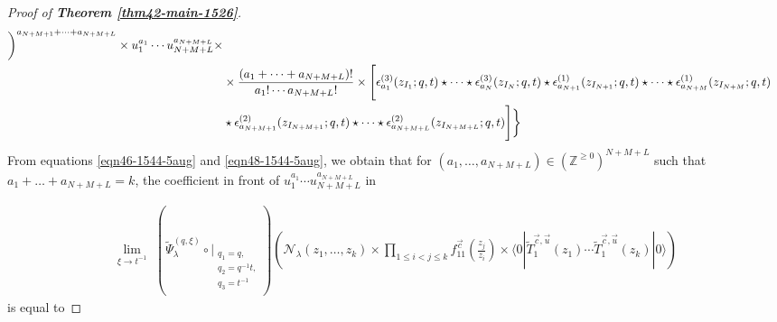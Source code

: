 \documentclass[12pt,reqno,a4paper]{amsart}
\newcommand{\comp}{\circ}
\newcommand{\cals}[1]{\mathcal{#1}}
\newcommand{\bb}[1]{\mathbb{#1}}
\numberwithin{equation}{section}
\newcommand{\dualmap}{
\widetilde{\Psi}^{(q,\xi)}_{\lambda}
}
\theoremstyle{definition}
\begin{document}
\begin{proof}[Proof of \textbf{Theorem \ref{thm42-main-1526}}]
\begin{align}
{	}
	\bigg)^{a_{N+M+1} + \cdots + a_{N+M+L}}
	\times
	u_1^{a_1}\cdots u_{N+M+L}^{a_{N+M+L}}
	\times 
	\notag 
	\\
	&\times
	\frac{
		\left(	a_1 + \cdots + a_{N+M+L}	 \right) !
	}{
		a_1! \cdots a_{N+M+L} !
	} 
	\times 
	\Bigg[
	\epsilon^{(3)}_{a_1}(z_{I_1} ; q,t) \star \cdots \star \epsilon^{(3)}_{a_N}(z_{I_N} ; q,t)
	\star \epsilon^{(1)}_{a_{N+1}}(z_{I_{N+1}} ; q,t) \star \cdots \star \epsilon^{(1)}_{a_{N+M}}(z_{I_{N+M}} ; q,t)
	\notag 
	\\
	&\star \epsilon^{(2)}_{a_{N+M+1}}(z_{I_{N+M+1}} ; q,t) \star \cdots \star \epsilon^{(2)}_{a_{N+M+L}}(z_{I_{N+M+L}} ; q,t)
	\Bigg]
	\biggr\}
	\notag 
\end{align}
\normalsize
From equations \eqref{eqn46-1544-5aug} and \eqref{eqn48-1544-5aug}, 
we obtain that for $(a_1,\dots,a_{N+M+L}) \in 
\left(
\bb{Z}^{\geq 0}
\right)^{N+M+L}$ such that $a_1 + \dots + a_{N+M+L} = k$, the coefficient in front of $u_1^{a_1}\cdots u_{N+M+L}^{a_{N+M+L}}$ in
 
\footnotesize
\begin{align}
	\lim_{\xi \rightarrow t^{-1}}\,\,
	(
	\dualmap
	\comp 
	\bigg|_{
		\substack{
			q_1 = q, \\
			q_2 = q^{-1}t,\\
			q_3 = t^{-1} \\
		}
	}
	)
	\left(
	\cals{N}_{\lambda}(z_1,\dots,z_k )
	\times
	\prod_{1 \leq i < j \leq k}f^{\vec{c}}_{11}\left(\frac{z_j}{z_i} \right)
	\times
	\langle 0 |\widetilde{T}^{\vec{c},\vec{u}}_{1}(z_1 )\cdots \widetilde{T}^{\vec{c},\vec{u}}_{1}(z_k )|0\rangle
	\right)
\end{align}
\normalsize
is equal to 


\end{proof}
\end{document}

